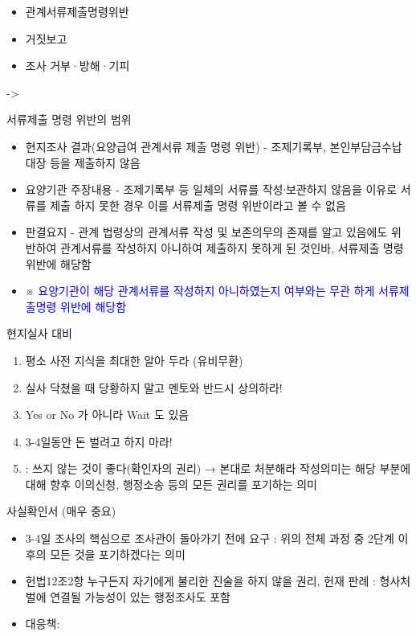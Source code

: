 \begin{itemize}\tightlist
\item 관계서류제출명령위반
\item 거짓보고
\item 조사 거부·방해·기피
\end{itemize}
-> \par
\begin{commentbox}{서류제출 명령 위반의 범위}
\begin{itemize}\tightlist
\item 현지조사 결과(요양급여 관계서류 제출 명령 위반) - 조제기록부, 본인부담금수납대장 등을 제출하지 않음
\item 요양기관 주장내용 - 조제기록부 등 일체의 서류를 작성∙보관하지 않음을 이유로 서류를 제출 하지 못한 경우 이를 서류제출 명령 위반이라고 볼 수 없음
\item 판결요지 - 관계 법령상의 관계서류 작성 및 보존의무의 존재를 알고 있음에도 위반하여 관계서류를 작성하지 아니하여 제출하지 못하게 된 것인바, 서류제출 명령 위반에 해당함
\item ※ \textcolor{blue}{요양기관이 해당 관계서류를 작성하지 아니하였는지 여부와는 무관 하게 서류제출명령 위반에 해당함}
\end{itemize}
\end{commentbox}

현지실사 대비
\begin{enumerate}[1.]\tightlist
\item 평소 사전 지식을 최대한 알아 두라 (유비무환)
\item 실사 닥쳤을 때 당황하지 말고 멘토와 반드시 상의하라!
\item Yes  or  No 가 아니라 Wait 도 있음
\item 3-4일동안 돈 벌려고 하지 마라!
\item {} : 쓰지 않는 것이 좋다(확인자의 권리) → 본대로 처분해라
    작성의미는 해당 부분에 대해 향후 이의신청, 행정소송 등의 모든 권리를 포기하는 의미 
\end{enumerate}

사실확인서 (매우 중요)
\begin{itemize}\tightlist
\item 3-4일 조사의 핵심으로 조사관이 돌아가기 전에 요구 : 위의 전체 과정 중 2단계 이후의 모든 것을 포기하겠다는 의미
\item 헌법12조2항   누구든지 자기에게 불리한 진술을 하지 않을 권리, 헌재 판례 : 형사처벌에 연결될 가능성이 있는 행정조사도 포함 
\item 대응책:   
\end{itemize}

